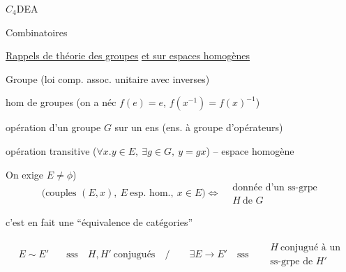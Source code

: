 $C_{4}$\qquad DEA

 Combinatoires

\uline{Rappels de théorie des groupes} \uline{et sur espaces homogènes}

Groupe (loi comp. assoc. unitaire avec inverses)

hom de groupes (on a néc $f(e)=e$, $f(x^{-1})=f(x)^{-1}$)

opération d'un groupe $G$ sur un ens (ens. à groupe d'opérateurs)

opération transitive ($\forall x\mathord{.}y\in E,\ \exists g\in G,\ y=gx$) -- espace homogène

On exige  $E\ne\phi$)
\[
\bigl(\text{couples }(E,x),\ E\ \text{esp. hom.},\ x\in E\bigr)
\Longleftrightarrow
\begin{aligned}&\text{donnée d'un ss-grpe}\\&H\ \text{de }G\end{aligned}
\]

c'est en fait une ``équivalence de catégories''

{\small
{}}
{\small
\[
\begin{aligned}
E\sim E' \quad &\text{sss}\quad H,H'\ \text{conjugués}\quad \big/\qquad
\exists E\to E'\quad\text{sss}\quad \begin{aligned}&H\ \text{conjugué à un}\\&\text{ss-grpe de }H'\end{aligned}
\end{aligned}
\]}

